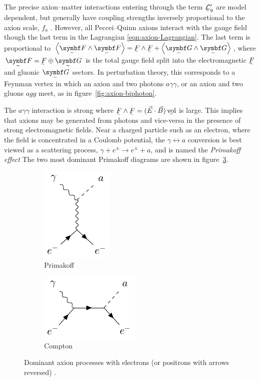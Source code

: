 The precise axion--matter interactions entering through the term $\LL_q'$ are model dependent, but generally have coupling strengths inversely proportional to the axion scale, $f_a$ \cite{Duffy_2009}.
However, all Peccei--Quinn axions interact with the gauge field though the last term in the Lagrangian \eqref{eqn:axion-Lagrangian}.
The last term is proportional to $\angbr{\tsbm F\wedge\tsbm F} = \ts F\wedge\ts F + \angbr{\tsbm G\wedge\tsbm G}$, where $\tsbm F = \ts F \oplus \tsbm G$ is the total gauge field split into the electromagnetic $\ts F$ and gluonic $\tsbm G$ sectors.
In perturbation theory, this corresponds to a Feynman vertex in which an axion and two photons $aγγ$, or an axion and two gluons $agg$ meet, as in figure~\ref{fig:axion-biphoton}.

The $aγγ$ interaction is strong where $\ts F\wedge\ts F = (\vec E \cdot \vec B)\,\vol$ is large.
This implies that axions may be generated from photons and vice-versa in the presence of strong electromagnetic fields.
Near a charged particle such as an electron, where the field is concentrated in a Coulomb potential, the $γ \leftrightarrow a$ conversion is best viewed as a scattering process, $γ + e^\pm \to e^\pm + a$, and is named the \emph{Primakoff effect} \cite[§\,93.1.3]{ParticleDataGroup-review-2020}
The two most dominant Primakoff diagrams are shown in figure~\ref{fig:scattering-processes}.

\begin{figure}[h]
	\centering
	\begin{subfigure}[]{0.4\textwidth}
		\centering
		\includegraphics{diagrams/primakoff-process.pdf}
		\caption{Primakoff}
		\label{fig:Primakoff-scattering}
	\end{subfigure}
	\begin{subfigure}[]{0.4\textwidth}
		\centering
		\includegraphics{diagrams/compton-process.pdf}
		\caption{Compton}
		\label{fig:Compton-scattering}
	\end{subfigure}
	\caption{Dominant axion processes with electrons (or positrons with arrows reversed) \cite{Cadamuro_2011}.}
	\label{fig:scattering-processes}
\end{figure}


